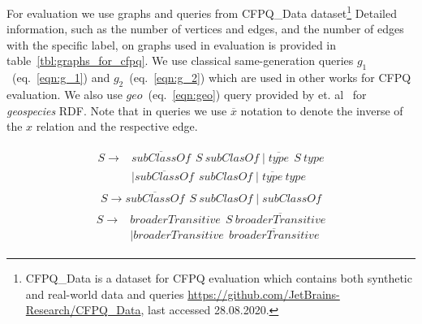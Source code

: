 For evaluation we use graphs and queries from CFPQ\_Data dataset\footnote{CFPQ\_Data is a dataset for CFPQ evaluation which contains both synthetic and real-world data and queries \url{https://github.com/JetBrains-Research/CFPQ\_Data}, last accessed 28.08.2020.}
Detailed information, such as the number of vertices and edges, and the number of edges with the specific label, on graphs used in evaluation is provided in table~\ref{tbl:graphs_for_cfpq}.
We use classical same-generation queries $g_1$~(eq.~\ref{eqn:g_1}) and $g_2$~(eq.~\ref{eqn:g_2}) which are used in other works for CFPQ evaluation.
We also use $geo$~(eq.~\ref{eqn:geo}) query provided by  et. al~\cite{Kuijpers:2019:ESC:3335783.3335791} for \textit{geospecies} RDF.
Note that in queries we use $\overline{x}$ notation to denote the inverse of the $x$ relation and the respective edge.

\begin{align}
\begin{split}
\label{eqn:g_1}
S \to & \overline{\textit{subClassOf}} \ \ S \ \textit{subClasOf} \mid \overline{\textit{type}} \ \ S \ \textit{type}\\   & \mid \overline{\textit{subClassOf}} \ \ \textit{subClasOf} \mid \overline{\textit{type}} \ \textit{type}
\end{split}
\end{align}
\begin{align}
\label{eqn:g_2}
S \to \overline{\textit{subClassOf}} \ \ S \ \textit{subClasOf} \mid \textit{subClassOf}
\end{align}
\begin{align}
\begin{split}
\label{eqn:geo}
S \to & \textit{broaderTransitive} \ \  S \ \overline{\textit{broaderTransitive}} \\
      & \mid \textit{broaderTransitive} \ \  \overline{\textit{broaderTransitive}}
\end{split}
\end{align}

